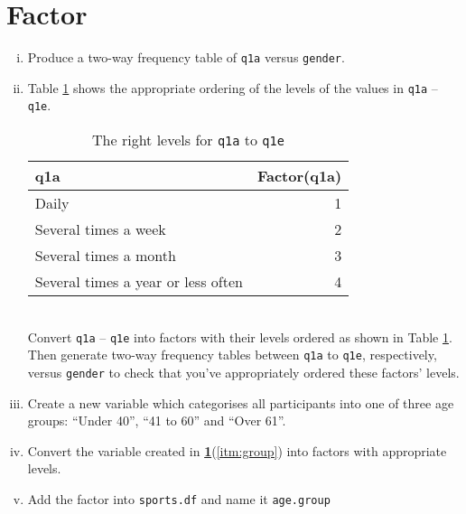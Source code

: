 \documentclass[12pt,a4paper]{article}\usepackage[]{graphicx}\usepackage[]{color}
\begin{document}
\section{Factor}
\label{sec:fac}
\begin{enumerate}[(i)] 
\item Produce a two-way frequency table of \texttt{q1a} versus \texttt{gender}.
\item Table \ref{tab:level} shows the appropriate ordering of the levels of the values in \texttt{q1a} -- \texttt{q1e}. \\
\begin{table}[!h]
  \centering
  \caption{The right levels for \texttt{q1a} to \texttt{q1e}}
  \begin{tabular}[h]{lr}
    q1a & Factor(q1a)\\
\hline
Daily & 1\\
Several times a week & 2\\
Several times a month & 3\\
Several times a year or less often & 4
  \end{tabular}
  \label{tab:level}
\end{table} \\
Convert \texttt{q1a} -- \texttt{q1e} into factors with their levels ordered as shown in Table \ref{tab:level}. Then generate two-way frequency tables between \texttt{q1a} to
\texttt{q1e}, respectively, versus \texttt{gender} to check that you've appropriately ordered these factors' levels.

\item \label{itm:group} Create a new variable which categorises all
  participants into one of three age groups: ``Under 40'', ``41 to 60'' and ``Over 61''.

\item Convert the variable created in {\bf \ref{sec:fac}}(\ref{itm:group})
  into factors with appropriate levels.

\item Add the factor into \texttt{sports.df} and name it \texttt{age.group}

\end{enumerate}
\end{document}
